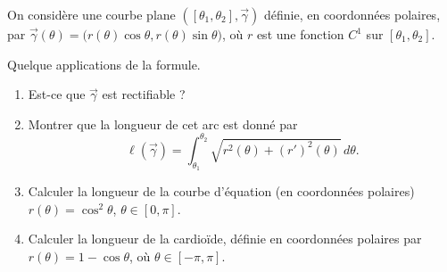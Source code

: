 \begin{exercice}\label{exoCourbesSurfaces0007}

On considère une courbe plane $([\theta_1, \theta _2], \vec{\gamma})$ définie, en coordonnées polaires, par $\vec{\gamma} (\theta ) = \big( r( \theta) \cos \theta, r( \theta) \sin \theta \big) $, où $r$ est une fonction $C^1$ sur $[\theta_1, \theta _2]$. 

Quelque applications de la formule.

\begin{enumerate}
	\item
		Est-ce que $ \vec{\gamma}$ est rectifiable ? 
	\item
		Montrer que la longueur de cet arc est donné par
		\begin{equation}		\label{EqFormDemExotLpola}
			\ell( \vec{\gamma}) = \int_{\theta_1}^{\theta _2} \sqrt{ r^2 ( \theta ) + (r')^2 ( \theta ) }\, d \theta. 
		\end{equation}
		
	\item
		Calculer la longueur de la courbe d'équation (en coordonnées polaires) $ r( \theta ) = \cos ^2 \theta$, $ \theta \in [0, \pi]$. 

	\item
		Calculer la longueur de la cardioïde, définie en coordonnées polaires par $ r( \theta ) = 1 - \cos \theta$, où $ \theta \in [- \pi,  \pi]$.  
		
\end{enumerate}

\end{exercice}
